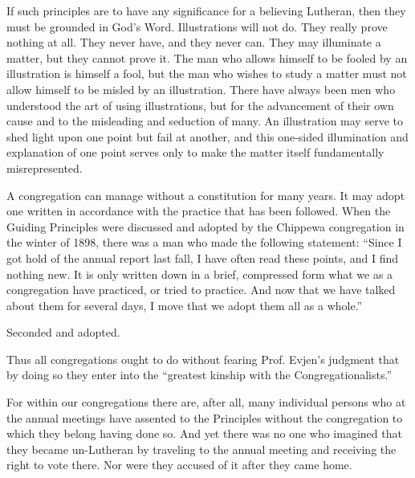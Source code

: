 If such principles are to have any significance for a believing Lutheran, then they must be grounded in God’s Word. Illustrations will not do. They really prove nothing at all. They never have, and they never can. They may illuminate a matter, but they cannot prove it. The man who allows himself to be fooled by an illustration is himself a fool, but the man who wishes to study a matter must not allow himself to be misled by an illustration. There have always been men who understood the art of using illustrations, but for the advancement of their own cause and to the misleading and seduction of many. An illustration may serve to shed light upon one point but fail at another, and this one-sided illumination and explanation of one point serves only to make the matter itself fundamentally misrepresented.

A congregation can manage without a constitution for many years. It may adopt one written in accordance with the practice that has been followed. When the Guiding Principles were discussed and adopted by the Chippewa congregation in the winter of 1898, there was a man who made the following statement: “Since I got hold of the annual report last fall, I have often read these points, and I find nothing new. It is only written down in a brief, compressed form what we as a congregation have practiced, or tried to practice. And now that we have talked about them for several days, I move that we adopt them all as a whole.”

Seconded and adopted.

Thus all congregations ought to do without fearing Prof. Evjen’s judgment that by doing so they enter into the “greatest kinship with the Congregationalists.”

For within our congregations there are, after all, many individual persons who at the annual meetings have assented to the Principles without the congregation to which they belong having done so. And yet there was no one who imagined that they became un-Lutheran by traveling to the annual meeting and receiving the right to vote there. Nor were they accused of it after they came home.